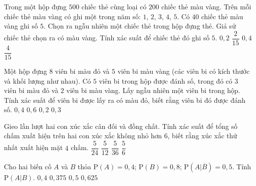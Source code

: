 \begin{ex}%
	Trong một hộp đựng $500$ chiếc thẻ cùng loại có $200$ chiếc thẻ màu vàng. Trên mỗi chiếc thẻ màu vàng có ghi một trong năm số: $1$, $2$, $3$, $4$, $5$. Có $40$ chiếc thẻ màu vàng ghi số $5$. Chọn ra ngẫu nhiên một chiếc thẻ trong hộp đựng thẻ. Giả sử chiếc thẻ chọn ra có màu vàng. Tính xác suất để chiếc thẻ đó ghi số $5$.
	\choice
	{\True $0{,}2$}
	{$\dfrac{2}{15}$}
	{$0{,}4$}
	{$\dfrac{4}{15}$}
\end{ex}	
\begin{ex}%
	Một hộp đựng $8$ viên bi màu đỏ và $5$ viên bi màu vàng (các viên bi có kích thước và khối lượng như nhau). Có $5$ viên bi trong hộp được đánh số, trong đó có $3$ viên bi màu đỏ và $2$ viên bi màu vàng. Lấy ngẫu nhiên một viên bi trong hộp. Tính xác suất để viên bi được lấy ra có màu đỏ, biết rằng viên bi đó được đánh số.
	\choice
	{$0{,}4$}
	{\True $0{,}6$}
	{$0{,}2$}
	{$0{,}3$}
\end{ex}	
\begin{ex}%
	Gieo lần lượt hai con xúc xắc cân đối và đồng chất. Tính xác suất để tổng số chấm xuất hiện trên hai con xúc xắc không nhỏ hơn $6$, biết rằng xúc xắc thứ nhất xuất hiện mặt $4$ chấm.
	\choice
	{$\dfrac{5}{24}$}
	{$\dfrac{5}{12}$}
	{$\dfrac{5}{36}$}
	{\True $\dfrac{5}{6}$}
\end{ex}
\begin{ex}%
	Cho hai biến cố $A$ và $B$ thỏa $\mathrm{P}(A)=0{,}4$; $\mathrm{P}(B)=0{,}8$; $\mathrm{P}\left(A| \overline{B}\right)=0{,}5$. Tính $\mathrm{P}(A|B)$.
	\choice
	{$0{,}4$}
	{\True $0{,}375$}
	{$0{,}5$}
	{$0{,}625$}
\end{ex}
